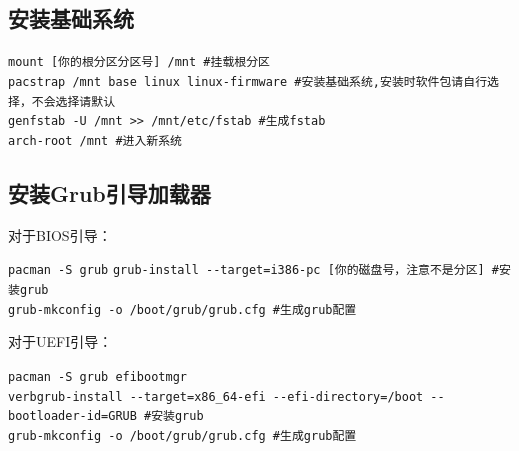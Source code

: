 \documentclass{article}
\newenvironment{singlecolumn}{
	\par
	\noindent
	\begin{minipage}[t]{\textwidth} 
		\setlength{\parfillskip}{0pt plus 1fil} 
	}{%
	\end{minipage}
	\par
}
\begin{document}
\begin{singlecolumn}
	
\begin{tcolorbox}
	\section*{安装基础系统}
\end{tcolorbox}

\begin{tcolorbox}[
	title=bash,
	boxrule=1pt,
	fonttitle=\bfseries,
	listing only, 
	listing options={language=bash}
	]
	\verb|mount [你的根分区分区号] /mnt #挂载根分区|\\
	\verb|pacstrap /mnt base linux linux-firmware #安装基础系统,安装时软件包请自行选择，不会选择请默认|\\
	\verb|genfstab -U /mnt >> /mnt/etc/fstab #生成fstab|\\
	\verb|arch-root /mnt #进入新系统|\\
\end{tcolorbox}	

\medskip

\begin{tcolorbox}
	\section*{安装Grub引导加载器}
\end{tcolorbox}

\textcolor{bios}{对于BIOS引导：}\\
\begin{tcolorbox}[
	title=bash,
	boxrule=1pt,
	fonttitle=\bfseries,
	listing only, 
	listing options={language=bash}
	]
	\verb|pacman -S grub|
	\verb|grub-install --target=i386-pc [你的磁盘号，注意不是分区] #安装grub|\\
	\verb|grub-mkconfig -o /boot/grub/grub.cfg #生成grub配置|\\
\end{tcolorbox}
\textcolor{uefi}{对于UEFI引导：}\\
\begin{tcolorbox}[
	title=bash,
	boxrule=1pt,
	fonttitle=\bfseries,
	listing only, 
	listing options={language=bash}
	]
	\verb|pacman -S grub efibootmgr|\\
	\verb|verbgrub-install --target=x86_64-efi --efi-directory=/boot --bootloader-id=GRUB #安装grub|\\
	\verb|grub-mkconfig -o /boot/grub/grub.cfg #生成grub配置|\\
\end{tcolorbox}


\end{singlecolumn}
\end{document}

